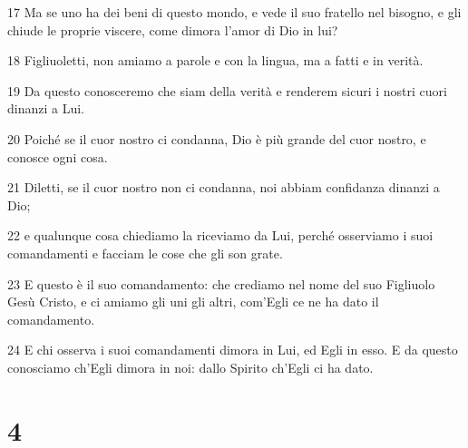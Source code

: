 \par 17 Ma se uno ha dei beni di questo mondo, e vede il suo fratello nel bisogno, e gli chiude le proprie viscere, come dimora l'amor di Dio in lui?
\par 18 Figliuoletti, non amiamo a parole e con la lingua, ma a fatti e in verità.
\par 19 Da questo conosceremo che siam della verità e renderem sicuri i nostri cuori dinanzi a Lui.
\par 20 Poiché se il cuor nostro ci condanna, Dio è più grande del cuor nostro, e conosce ogni cosa.
\par 21 Diletti, se il cuor nostro non ci condanna, noi abbiam confidanza dinanzi a Dio;
\par 22 e qualunque cosa chiediamo la riceviamo da Lui, perché osserviamo i suoi comandamenti e facciam le cose che gli son grate.
\par 23 E questo è il suo comandamento: che crediamo nel nome del suo Figliuolo Gesù Cristo, e ci amiamo gli uni gli altri, com'Egli ce ne ha dato il comandamento.
\par 24 E chi osserva i suoi comandamenti dimora in Lui, ed Egli in esso. E da questo conosciamo ch'Egli dimora in noi: dallo Spirito ch'Egli ci ha dato.

\chapter{4}

